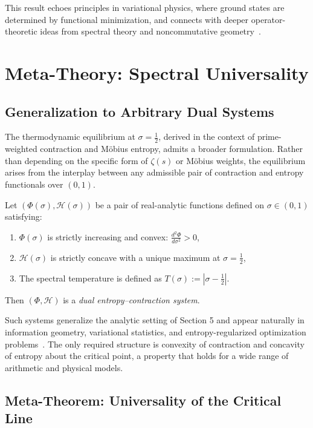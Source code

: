 \documentclass[12pt]{article}
\begin{document}
This result echoes principles in variational physics, where ground states are determined by functional minimization, and connects with deeper operator-theoretic ideas from spectral theory and noncommutative geometry~\cite{connes1996noncommutative, hejhal1976selberg}.


\section{Meta-Theory: Spectral Universality}

\subsection{Generalization to Arbitrary Dual Systems}

The thermodynamic equilibrium at $\sigma = \tfrac{1}{2}$, derived in the context of prime-weighted contraction and Möbius entropy, admits a broader formulation. Rather than depending on the specific form of $\zeta(s)$ or Möbius weights, the equilibrium arises from the interplay between any admissible pair of contraction and entropy functionals over $(0,1)$.

\begin{definition}
Let $(\Phi(\sigma), \mathcal{H}(\sigma))$ be a pair of real-analytic functions defined on $\sigma \in (0,1)$ satisfying:
\begin{enumerate}
    \item $\Phi(\sigma)$ is strictly increasing and convex: $\frac{d^2\Phi}{d\sigma^2} > 0$,
    \item $\mathcal{H}(\sigma)$ is strictly concave with a unique maximum at $\sigma = \tfrac{1}{2}$,
    \item The spectral temperature is defined as $T(\sigma) := |\sigma - \tfrac{1}{2}|$.
\end{enumerate}
Then $(\Phi, \mathcal{H})$ is a \emph{dual entropy–contraction system}.
\end{definition}

Such systems generalize the analytic setting of Section 5 and appear naturally in information geometry, variational statistics, and entropy-regularized optimization problems~\cite{ellis1985entropy}. The only required structure is convexity of contraction and concavity of entropy about the critical point, a property that holds for a wide range of arithmetic and physical models.

\subsection{Meta-Theorem: Universality of the Critical Line}
\end{document}
